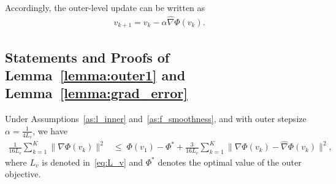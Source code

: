 \documentclass[11 pt]{article}
\begin{document}
Accordingly, the outer-level update can be written as 
\begin{align*}
v_{k+1} = v_k - \alpha \widehat{\nabla}\Phi(v_k).
\end{align*}



\subsection{Statements and Proofs of Lemma~\ref{lemma:outer1} and Lemma~\ref{lemma:grad_error}}
\begin{lemma} \label{lemma:outer1} Under Assumptions~\ref{as:l_inner} and~\ref{as:f_smoothness}, and with outer stepsize $\alpha = \tfrac{1}{4L_v}$, we have {\small \begin{align} \label{eq:outer1} \frac{1}{16L_v} \sum_{k=1}^{K} \|\nabla\Phi(v_k)\|^2 &\le\; \Phi(v_1) - \Phi^*  + \frac{3}{16L_v} \sum_{k=1}^{K} \|\nabla\Phi(v_k) - \widehat{\nabla}\Phi(v_k)\|^2, \end{align}} where $L_v$ is denoted in~\eqref{eq:L_v} and $\Phi^*$ denotes the optimal value of the outer objective. \end{lemma}
\end{document}
